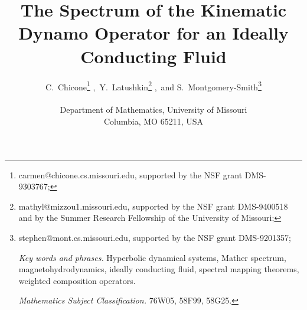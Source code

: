 \newcommand{\vl}[1]{{\bf #1}}
\newcommand{\tp}[1]{``{\it #1\/}''}
\newcommand{\disp}{\displaystyle}
\newcommand{\lb}{\label}
\newcommand{\ti}{\tilde}
\newcommand{\bs}{\backslash}
\newcommand{\bi}[1]{\bibitem{#1}}
\newcommand{\emt}{\emptyset}
\newcommand{\no}{\nonumber}
\newcommand{\lra}{\longrightarrow}

\newcommand{\subfig}{a}



\makeatletter
\def\@currentlabel{2.1}\label{e:dispaa}
\def\@currentlabel{2.21}\label{e:dispau}
\def\@currentlabel{2.22}\label{e:dispav}
\def\@currentlabel{2.23}\label{e:dispaw}
\def\@currentlabel{2.24}\label{e:dispax}
\def\theequation{\thesection.\@arabic\c@equation}
\def\Qed{\hfill \vrule height4pt width3pt depth2pt}

\def\sap{\sigma_{\mbox{ap}}}
\def\C{{C(X,\TX)}}
\def\CND{{C_{ND}(X,\TX)}}

\makeatother

\makeatletter
\def\alphenumi{%
  \def\theenumi{\alph{enumi}}%
  \def\p@enumi{\theenumi}%
  \def\labelenumi{(\@alph\c@enumi)}}
\makeatother


\def\zzz{\par}

\title{The Spectrum of the
Kinematic Dynamo Operator
for an Ideally Conducting Fluid}

\author{C.~Chicone\thanks{carmen$@$chicone.cs.missouri.edu,  supported by
the NSF grant
DMS-9303767;} ,\,
Y.~Latushkin\thanks{mathyl$@$mizzou1.missouri.edu, supported  by the
NSF grant DMS-9400518 and by the Summer
Research Fellowship of the University of Missouri;} ,\,
 and
S.~Montgomery-Smith\thanks{stephen$@$mont.cs.missouri.edu, supported by
the NSF grant  DMS-9201357;
\zzz
{\em Key words and phrases.} Hyperbolic dynamical systems,
 Mather spectrum,
magnetohydrodynamics,
ideally conducting fluid, spectral
mapping theorems, weighted composition
operators.
\zzz
 {\em Mathematics Subject Classification.} 76W05, 58F99, 58G25.}\\
\\
Department of  Mathematics,
University of Missouri\\ Columbia, MO 65211, USA}

\maketitle

